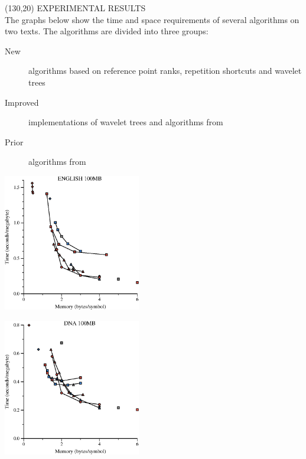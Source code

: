  \begin{textblock}{60}(130,20)
  {\sffamily\normalsize{\color{sciorange}
      EXPERIMENTAL RESULTS}}\vspace{1mm}\\
  \footnotesize 
  The graphs below show the time and space requirements of several
  algorithms on two texts.  The algorithms are divided
  into three groups:
  \begin{description}
  \item[\color{new}New] algorithms based on reference point ranks, repetition
    shortcuts and wavelet trees
  \item[\color{improved}Improved] implementations of wavelet trees and
    algorithms from~\cite{ll2005}
  \item[\color{prior}Prior] algorithms from~\cite{s2001,ll2005}
  \end{description}
  \vspace{2mm}

  \includegraphics[width=60mm]{eng100Mb-new}
  \vspace{2mm}

  \includegraphics[width=60mm]{dna100Mb-new}
\end{textblock}
